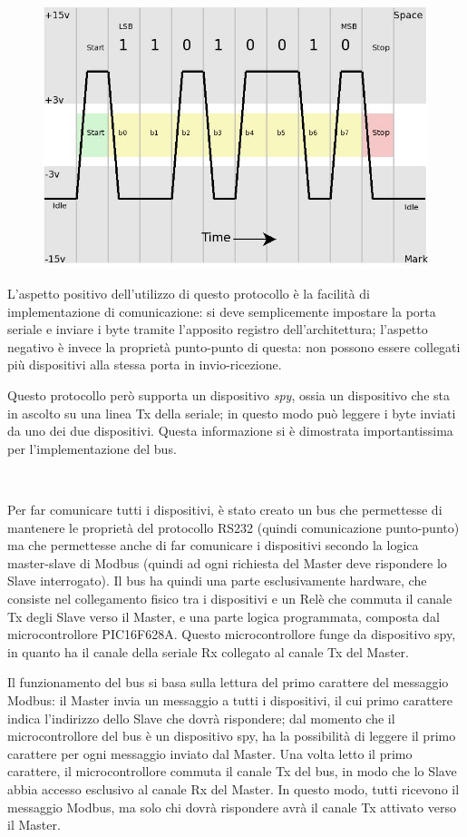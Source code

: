 \documentclass[a4paper,titlepage]{book}
\begin{document}
\begin{figure}[!h]
\centering
\includegraphics[scale=0.35]{rs232.jpg}
\end{figure}

L'aspetto positivo dell'utilizzo di questo protocollo è la facilità di implementazione di comunicazione: si deve semplicemente impostare la porta seriale e inviare i byte tramite l'apposito registro dell'architettura; l'aspetto negativo è invece la proprietà punto-punto di questa: non possono essere collegati più dispositivi alla stessa porta in invio-ricezione.

Questo protocollo però supporta un dispositivo \textit{spy}, ossia un dispositivo che sta in ascolto su una linea Tx della seriale; in questo modo può leggere i byte inviati da uno dei due dispositivi. Questa informazione si è dimostrata importantissima per l'implementazione del bus.

~

Per far comunicare tutti i dispositivi, è stato creato un bus che permettesse di mantenere le proprietà del protocollo RS232 (quindi comunicazione punto-punto) ma che permettesse anche di far comunicare i dispositivi secondo la logica master-slave di Modbus (quindi ad ogni richiesta del Master deve rispondere lo Slave interrogato). Il bus ha quindi una parte esclusivamente hardware, che consiste nel collegamento fisico tra i dispositivi e un Relè che commuta il canale Tx degli Slave verso il Master, e una parte logica programmata, composta dal microcontrollore PIC16F628A. Questo microcontrollore funge da dispositivo spy, in quanto ha il canale della seriale Rx collegato al canale Tx del Master.

Il funzionamento del bus si basa sulla lettura del primo carattere del messaggio Modbus: il Master invia un messaggio a tutti i dispositivi, il cui primo carattere indica l'indirizzo dello Slave che dovrà rispondere; dal momento che il microcontrollore del bus è un dispositivo spy, ha la possibilità di leggere il primo carattere per ogni messaggio inviato dal Master. Una volta letto il primo carattere, il microcontrollore commuta il canale Tx del bus, in modo che lo Slave abbia accesso esclusivo al canale Rx del Master. In questo modo, tutti ricevono il messaggio Modbus, ma solo chi dovrà rispondere avrà il canale Tx attivato verso il Master.
\end{document}
